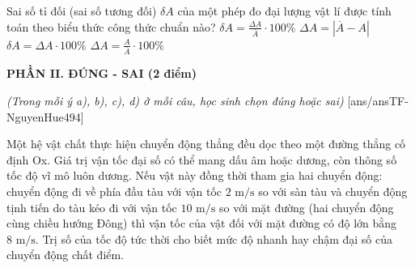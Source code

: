 	\begin{ex}%
		Sai số tỉ đối (sai số tương đối) $\delta A$ của một phép đo đại lượng vật lí được tính toán theo biểu thức công thức chuẩn nào?
		\choice
		{\True $\delta A = \frac{\Delta A}{\overline{A}} \cdot 100\%$}
		{$\Delta A = |\overline{A} - A|$}
		{$\delta A = \Delta A \cdot 100\%$}
		{$\Delta A = \frac{A}{\overline{A}} \cdot 100\%$}
	\end{ex}
	
	
	\noindent \textbf{PHẦN II. ĐÚNG - SAI (2 điểm)}
	
	\noindent \textit{(Trong mỗi ý a), b), c), d) ở mỗi câu, học sinh chọn đúng hoặc sai)}
	[ans/ansTF-NguyenHue494]
	
	\begin{ex}%
		Một hệ vật chất thực hiện chuyển động thẳng đều dọc theo một đường thẳng cố định Ox.
		{\True Giá trị vận tốc đại số có thể mang dấu âm hoặc dương, còn thông số tốc độ vĩ mô luôn dương.}
		{Nếu vật này đồng thời tham gia hai chuyển động: chuyển động đi về phía đầu tàu với vận tốc $2\text{ m/s}$ so với sàn tàu và chuyển động tịnh tiến do tàu kéo đi với vận tốc $10\text{ m/s}$ so với mặt đường (hai chuyển động cùng chiều hướng Đông) thì vận tốc của vật đối với mặt đường có độ lớn bằng $8\text{ m/s}$.}
		{\True Trị số của tốc độ tức thời cho biết mức độ nhanh hay chậm đại số của chuyển động chất điểm.}
	\end{ex}
	
